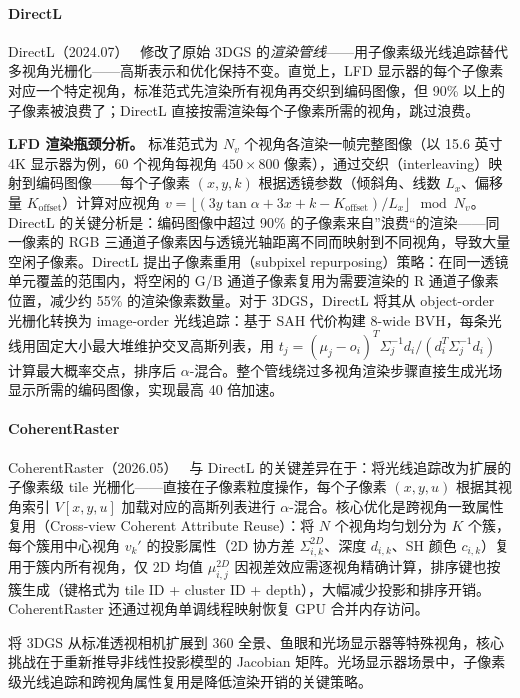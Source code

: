 \paragraph{DirectL}
DirectL（2024.07）~\cite{2407_14053} 修改了原始 3DGS 的\emph{渲染管线}——用子像素级光线追踪替代多视角光栅化——高斯表示和优化保持不变。直觉上，LFD 显示器的每个子像素对应一个特定视角，标准范式先渲染所有视角再交织到编码图像，但 90\% 以上的子像素被浪费了；DirectL 直接按需渲染每个子像素所需的视角，跳过浪费。

\textbf{LFD 渲染瓶颈分析。}
标准范式为 $N_v$ 个视角各渲染一帧完整图像（以 15.6 英寸 4K 显示器为例，60 个视角每视角 $450 \times 800$ 像素），通过交织（interleaving）映射到编码图像——每个子像素 $(x,y,k)$ 根据透镜参数（倾斜角、线数 $L_x$、偏移量 $K_{\text{offset}}$）计算对应视角 $v = \lfloor (3y \tan\alpha + 3x + k - K_{\text{offset}})/L_x \rfloor \mod N_v$。DirectL 的关键分析是：编码图像中超过 90\% 的子像素来自”浪费“的渲染——同一像素的 RGB 三通道子像素因与透镜光轴距离不同而映射到不同视角，导致大量空闲子像素。DirectL 提出子像素重用（subpixel repurposing）策略：在同一透镜单元覆盖的范围内，将空闲的 G/B 通道子像素复用为需要渲染的 R 通道子像素位置，减少约 55\% 的渲染像素数量。对于 3DGS，DirectL 将其从 object-order 光栅化转换为 image-order 光线追踪：基于 SAH 代价构建 8-wide BVH，每条光线用固定大小最大堆维护交叉高斯列表，用 $t_j = (\mu_j - o_i)^T \Sigma_j^{-1} d_i / (d_i^T \Sigma_j^{-1} d_i)$ 计算最大概率交点，排序后 $\alpha$-混合。整个管线绕过多视角渲染步骤直接生成光场显示所需的编码图像，实现最高 40 倍加速。

\paragraph{CoherentRaster}
CoherentRaster（2026.05）~\cite{2605_04509} 与 DirectL 的关键差异在于：将光线追踪改为扩展的子像素级 tile 光栅化——直接在子像素粒度操作，每个子像素 $(x,y,u)$ 根据其视角索引 $V[x,y,u]$ 加载对应的高斯列表进行 $\alpha$-混合。核心优化是跨视角一致属性复用（Cross-view Coherent Attribute Reuse）：将 $N$ 个视角均匀划分为 $K$ 个簇，每个簇用中心视角 $v_k'$ 的投影属性（2D 协方差 $\Sigma_{i,k}^{2D}$、深度 $d_{i,k}$、SH 颜色 $c_{i,k}$）复用于簇内所有视角，仅 2D 均值 $\mu_{i,j}^{2D}$ 因视差效应需逐视角精确计算，排序键也按簇生成（键格式为 tile ID + cluster ID + depth），大幅减少投影和排序开销。CoherentRaster 还通过视角单调线程映射恢复 GPU 合并内存访问。

\begin{takeaway}
将 3DGS 从标准透视相机扩展到 360\textdegree{} 全景、鱼眼和光场显示器等特殊视角，核心挑战在于重新推导非线性投影模型的 Jacobian 矩阵。光场显示器场景中，子像素级光线追踪和跨视角属性复用是降低渲染开销的关键策略。
\end{takeaway}

